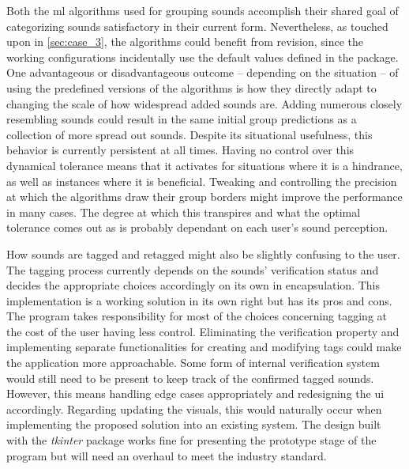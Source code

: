 Both the \gls{ml} algorithms used for grouping sounds accomplish their shared goal of categorizing sounds satisfactory in their current form. Nevertheless, as touched upon in \cref{sec:case_3}, the algorithms could benefit from revision, since the working configurations incidentally use the default values defined in the package. One advantageous or disadvantageous outcome – depending on the situation – of using the predefined versions of the algorithms is how they directly adapt to changing the scale of how widespread added sounds are. Adding numerous closely resembling sounds could result in the same initial group predictions as a collection of more spread out sounds. Despite its situational usefulness, this behavior is currently persistent at all times. Having no control over this dynamical tolerance means that it activates for situations where it is a hindrance, as well as instances where it is beneficial. Tweaking and controlling the precision at which the algorithms draw their group borders might improve the performance in many cases. The degree at which this transpires and what the optimal tolerance comes out as is probably dependant on each user's sound perception.

How sounds are tagged and retagged might also be slightly confusing to the user. The tagging process currently depends on the sounds' verification status and decides the appropriate choices accordingly on its own in encapsulation. This implementation is a working solution in its own right but has its pros and cons. The program takes responsibility for most of the choices concerning tagging at the cost of the user having less control. Eliminating the verification property and implementing separate functionalities for creating and modifying tags could make the application more approachable. Some form of internal verification system would still need to be present to keep track of the confirmed tagged sounds. However, this means handling edge cases appropriately and redesigning the \gls{ui} accordingly. Regarding updating the visuals, this would naturally occur when implementing the proposed solution into an existing system. The design built with the \emph{tkinter} package works fine for presenting the prototype stage of the program but will need an overhaul to meet the industry standard.

\egroup{}
